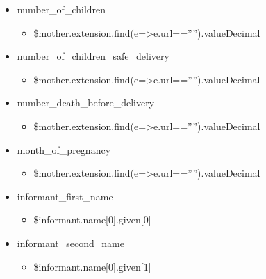 \documentclass[letterpaper,10pt,english]{sphinxmanual}
\begin{document}
\begin{itemize}
\begin{itemize}
\end{itemize}

\item {} 
\sphinxAtStartPar
number\_of\_children
\begin{itemize}
\item {} 
\sphinxAtStartPar
\$mother.extension.find(e=\textgreater{}e.url==””).valueDecimal

\end{itemize}

\item {} 
\sphinxAtStartPar
number\_of\_children\_safe\_delivery
\begin{itemize}
\item {} 
\sphinxAtStartPar
\$mother.extension.find(e=\textgreater{}e.url==””).valueDecimal

\end{itemize}

\item {} 
\sphinxAtStartPar
number\_death\_before\_delivery
\begin{itemize}
\item {} 
\sphinxAtStartPar
\$mother.extension.find(e=\textgreater{}e.url==””).valueDecimal

\end{itemize}

\item {} 
\sphinxAtStartPar
month\_of\_pregnancy
\begin{itemize}
\item {} 
\sphinxAtStartPar
\$mother.extension.find(e=\textgreater{}e.url==””).valueDecimal

\end{itemize}

\item {} 
\sphinxAtStartPar
informant\_first\_name
\begin{itemize}
\item {} 
\sphinxAtStartPar
\$informant.name{[}0{]}.given{[}0{]}

\end{itemize}

\item {} 
\sphinxAtStartPar
informant\_second\_name
\begin{itemize}
\item {} 
\sphinxAtStartPar
\$informant.name{[}0{]}.given{[}1{]}


\end{itemize}
\end{itemize}
\end{document}
